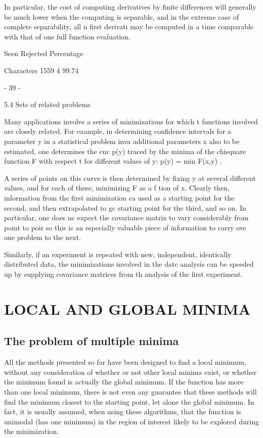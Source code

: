      In particular, the cost of computing derivatives by finite differences will generally be much lower when the computing is separable,
and in the extreme case of complete separability, all n first derivati
may be computed in a time comparable with that of one full function
evaluation.
 
                 Seen Rejected  Percentage
 
Characters       1559        4   99.74
 
                                - 39 -
 
 
5.4  Sets of related problems
 
     Many applications involve a series of minimizations for which t
functions involved are closely related.  For example, in determining
confidence intervals for a parameter y in a statistical problem inva
additional parameters x also to be estimated, one determines the cuc
p(y) traced by the minima of the chisquare function F with respect t
for different values of y:
p(y) = min F(x,y) .
 
 
A series of points on this curve is then determined by fixing y at
several different values, and for each of these, minimizing F as a f
tion of x.  Clearly then, information from the first minimization ca
used as a starting point for the second, and then extrapolated to gc
starting point for the third, and so on.  In particular, one does nc
expect the covariance matrix to vary considerably from point to poir
so this is an especially valuable piece of information to carry ove
one problem to the next.
 
     Similarly, if an experiment is repeated with new, independent,
identically distributed data, the minimizations involved in the datc
analysis can be speeded up by supplying covariance matrices from th
analysis of the first experiment.
 
 
 
\chapter{LOCAL AND GLOBAL MINIMA}
\section{The problem of multiple minima}
     All the methods presented so far have been designed to find a local
minimum, without any consideration of whether or not other local minima
exist, or whether the minimum found is actually the global minimum.
If the function has more than one local minimum, there is not even any
guarantee that these methods will find the minimum closest to the
starting point, let alone the global minimum.  In fact, it is usually
assumed, when using these algorithms, that the function is unimodal
(has one minimum) in the region of interest likely to be explored
during the minimization.
 
